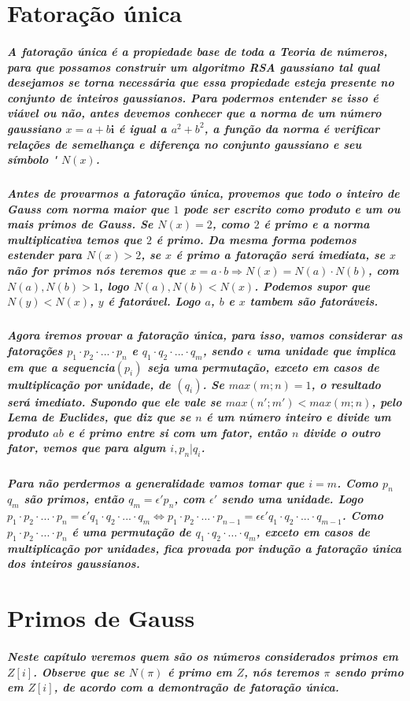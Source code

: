 \section{Fatora\c{c}\~ao \'unica}
\subparagraph{
A fatora\c{c}\~ao \'unica \'e a propiedade base de toda a Teoria de n\'umeros, para que possamos construir um algoritmo RSA gaussiano tal qual desejamos se torna necess\'aria que essa propiedade esteja presente no conjunto de inteiros gaussianos. Para podermos entender se isso \'e vi\'avel ou n\~ao, antes devemos conhecer que a \textit{norma} de um n\'umero gaussiano $x=a+b\textbf{i}$ \'e igual a $a^2 + b^2$, a fun\c{c}\~ao da norma \'e verificar rela\c{c}\~oes de semelhan\c{c}a e diferen\c{c}a no conjunto gaussiano e seu s\'imbolo \' $N(x)$.
}
\subparagraph{
Antes de provarmos a fatora\c{c}\~ao \'unica, provemos que todo o inteiro de Gauss com norma maior que $1$ pode ser escrito como produto e um ou mais primos de Gauss. Se $N(x)=2$, como $2$ \'e primo e a norma multiplicativa temos que $2$ \'e primo. Da mesma forma podemos estender para $N(x)>2$, se $x$ \'e primo a fatora\c{c}\~ao ser\'a imediata, se $x$ n\~ao for primos n\'os teremos que $x=a \cdot b \Rightarrow N(x) = N(a) \cdot N(b)$, com $ N(a), N(b) > 1$, logo $ N(a), N(b) < N(x)$. Podemos supor que $N(y) < N(x)$, $y$ \'e fator\'avel. Logo $a$, $b$ e $x$ tambem s\~ao fator\'aveis.
}
\subparagraph{
Agora iremos provar a fatora\c{c}\~ao \'unica, para isso, vamos considerar as fatora\c{c}\~oes $p_1 \cdot p_2 \cdot ... \cdot p_n$ e $q_1 \cdot q_2 \cdot ... \cdot q_m$, sendo $\epsilon$  uma unidade que implica em que a sequencia$(p_i)$ seja uma permuta\c{c}\~ao, exceto em casos de multiplica\c{c}\~ao por unidade, de $(q_i)$. Se $max(m;n) = 1$, o resultado ser\'a imediato. Supondo que ele vale se $max(n';m') < max(m;n)$, pelo Lema de Euclides, que diz que se $n$ \'e um n\'umero inteiro e divide um produto $ab$ e \'e primo entre si com um fator, ent\~ao $n$ divide o outro fator, vemos que para algum $i, p_n| q_i$.
}
\subparagraph{
Para n\~ao perdermos a generalidade vamos tomar que $i=m$. Como $p_n$  $q_m$ s\~ao primos, ent\~ao $q_m = \epsilon' p_n$, com $\epsilon'$ sendo uma unidade. Logo $p_1 \cdot p_2 \cdot ... \cdot p_n = \epsilon'q_1 \cdot q_2 \cdot ... \cdot q_m \Leftrightarrow p_1 \cdot p_2 \cdot ... \cdot p_{n-1} = \epsilon\epsilon'q_1 \cdot q_2 \cdot ... \cdot q_{m-1} $. Como $p_1 \cdot p_2 \cdot ... \cdot p_n$ \'e uma permuta\c{c}\~ao de $q_1 \cdot q_2 \cdot ... \cdot q_m$, exceto em casos de multiplica\c{c}\~ao por unidades, fica provada por indu\c{c}\~ao a fatora\c{c}\~ao \'unica dos inteiros gaussianos.
}
\section{Primos de Gauss}
\subparagraph{
Neste cap\'itulo veremos quem s\~ao os n\'umeros considerados primos em $Z[i]$. Observe que se $N(\pi)$ \'e primo em $Z$, n\'os teremos $\pi$ sendo primo em $Z[i]$, de acordo com a demontra\c{c}\~ao de fatora\c{c}\~ao \'unica. }